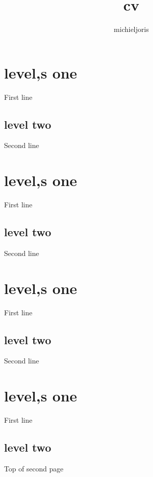 \documentclass[11pt]{article}
\title{cv}
\author{michieljoris}
\date{}
\begin{document}
\maketitle


\section*{level,s one}
\label{sec-1}


First line
\subsection*{level two}
\label{sec-1-1}


Second line
\section*{level,s one}
\label{sec-2}


First line
\subsection*{level two}
\label{sec-2-1}


Second line
\section*{level,s one}
\label{sec-3}


First line
\subsection*{level two}
\label{sec-3-1}


Second line
\section*{level,s one}
\label{sec-4}


First line
\subsection*{level two}
\label{sec-4-1}


Top of second page
\end{document}
